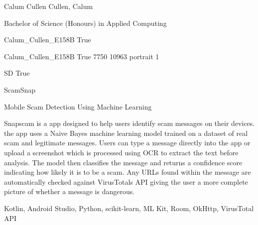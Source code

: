 \documentclass[twoside]{report}
\begin{document}
\begingroup{}\relax



\def\Key{Calum_Cullen_E158B}

{Calum Cullen}
{Cullen, Calum}

{Bachelor of Science (Honours) in Applied Computing}

{Calum_Cullen_E158B}
{True}

{Calum_Cullen_E158B}
{True}
{7750}
{10963}
{portrait}
{1}

{SD}
{True}

{ScamSnap}

{Mobile Scam Detection Using Machine Learning}

{Snapscam is a app designed to help users identify scam messages on their devices. the app uses a Naive Bayes machine learning model trained on a dataset of real scam and legitimate messages. Users can type a message directly into the app or upload a screenshot which is processed using OCR to extract the text before analysis. The model then classifies the message and returns a confidence score indicating how likely it is to be a scam. Any URLs found within the message are automatically checked against VirusTotals API giving the user a more complete picture of whether a message is dangerous.}

{Kotlin, Android Studio, Python, scikit-learn, ML Kit, Room, OkHttp, VirusTotal API}
\end{document}
